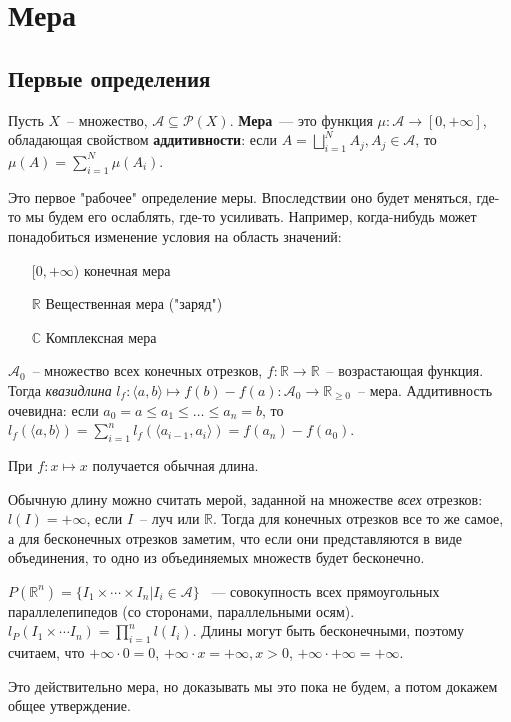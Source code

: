 \chapter{Мера}
\section{Первые определения}
\begin{definition}
	Пусть $X$~-- множество, $\mathcal{A}\subseteq\mathcal{P}(X)$. {\bf Мера}~--- это функция $\mu\colon\mathcal{A}\to[0,+\infty]$, обладающая свойством {\bf аддитивности}: если $A=\bigsqcup_{i=1}^NA_j, A_j\in\mathcal{A}$, то $\mu(A)=\sum_{i=1}^N\mu(A_i)$.
\end{definition}
Это первое "рабочее" определение меры. Впоследствии оно будет меняться, где-то мы будем его ослаблять, где-то усиливать. Например, когда-нибудь может понадобиться изменение условия на область значений:
\begin{itemize}
	\item[$[0,+\infty)$] конечная мера
	\item[$\mathbb{R}$] Вещественная мера ("заряд")
	\item[$\mathbb{C}$] Комплексная мера
\end{itemize}
\begin{example}
	$\mathcal{A}_0$~-- множество всех конечных отрезков, $f\colon\mathbb{R}\to\mathbb{R}$~-- возрастающая функция. Тогда {\it квазидлина} $l_f\colon\langle a,b\rangle\mapsto f(b)-f(a)\colon\mathcal{A}_0\to\mathbb{R}_{\ge0}$~-- мера. Аддитивность очевидна: если $a_0=a\le a_1\le\ldots\le a_n=b$, то $l_f(\langle a,b\rangle)=\sum_{i=1}^{n}l_f(\langle a_{i-1},a_i\rangle)=f(a_n)-f(a_0)$.

	При $f\colon x\mapsto x$ получается обычная длина.
\end{example}
\begin{example}
	Обычную длину можно считать мерой, заданной на множестве {\it всех} отрезков: $l(I)=+\infty$, если $I$~-- луч или $\mathbb{R}$. Тогда для конечных отрезков все то же самое, а для бесконечных отрезков заметим, что если они представляются в виде объединения, то одно из объединяемых множеств будет бесконечно.
\end{example}
\begin{example}
	$P(\mathbb{R}^n)=\{I_1\times\cdots\times I_n|I_i\in\mathcal{A}\}$ ~--- совокупность всех прямоугольных параллелепипедов (со сторонами, параллельными осям). $l_P(I_1\times\cdots I_n)=\prod_{i=1}^{n}l(I_i)$. Длины могут быть бесконечными, поэтому считаем, что $+\infty\cdot0=0$, $+\infty\cdot x=+\infty, x>0$, $+\infty\cdot+\infty=+\infty$.

	Это действительно мера, но доказывать мы это пока не будем, а потом докажем общее утверждение.
\end{example}

